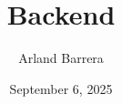 \documentclass{extbook}
\title{Backend}
\author{Arland Barrera}
\date{September 6, 2025}
\begin{document}
\maketitle



\tableofcontents


\expandafter\itincap\expandafter{\temas}


% 
% 
\end{document}
